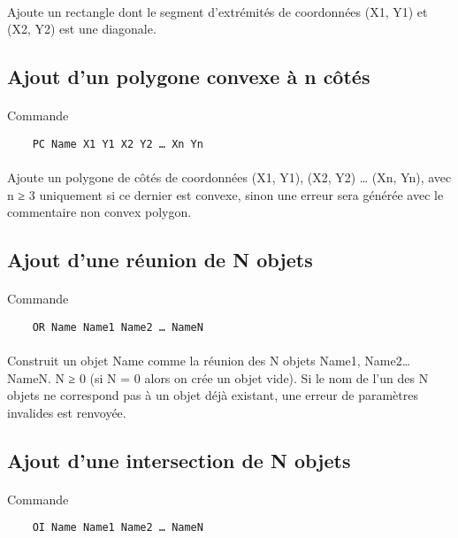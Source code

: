 \paragraph{}
Ajoute un rectangle dont le segment d'extrémités de coordonnées (X1, Y1) et (X2, Y2) est une diagonale.

\subsection{Ajout d'un polygone convexe à n côtés}
 \paragraph{}
Commande
\begin{lstlisting}
	PC Name X1 Y1 X2 Y2 … Xn Yn
\end{lstlisting}
\paragraph{}
Ajoute un polygone de côtés de coordonnées (X1, Y1), (X2, Y2) … (Xn, Yn), avec n ≥ 3 uniquement si ce dernier est convexe, sinon une erreur sera générée avec le commentaire non convex polygon.

\subsection{Ajout d'une réunion de N objets}
 \paragraph{}
Commande
\begin{lstlisting}
	OR Name Name1 Name2 … NameN
\end{lstlisting}
\paragraph{}
Construit un objet Name comme la réunion des N objets Name1, Name2… NameN. N ≥ 0 (si N = 0 alors on crée un objet vide). Si le nom de l'un des N objets ne correspond pas à un objet déjà existant, une erreur de paramètres invalides est renvoyée.

\subsection{Ajout d'une intersection de N objets}
 \paragraph{}
Commande
\begin{lstlisting}
	OI Name Name1 Name2 … NameN
\end{lstlisting}

